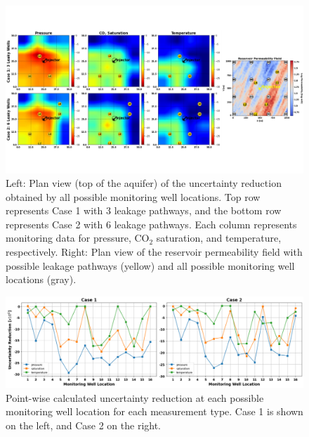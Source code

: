 \documentclass[a4paper,fleqn]{cas-sc}
\begin{document}
\begin{figure}
    \centering
    \includegraphics[width=16.5cm]{figs/Figure 10.pdf}
    \caption{Left: Plan view (top of the aquifer) of the uncertainty reduction obtained by all possible monitoring well locations. Top row represents Case 1 with 3 leakage pathways, and the bottom row represents Case 2 with 6 leakage pathways. Each column represents monitoring data for pressure, CO$_2$ saturation, and temperature, respectively. Right: Plan view of the reservoir permeability field with possible leakage pathways (yellow) and all possible monitoring well locations (gray).}
    \label{heatmaps}
\end{figure}

\begin{figure}
    \centering
    \includegraphics[width=16cm]{figs/Figure 11.pdf}
    \caption{Point-wise calculated uncertainty reduction at each possible monitoring well location for each measurement type. Case 1 is shown on the left, and Case 2 on the right.}
    \label{point_ur}
\end{figure}
\end{document}
